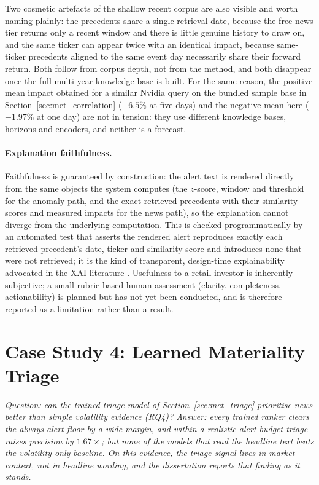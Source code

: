 Two cosmetic artefacts of the shallow recent corpus are also visible and worth
naming plainly: the precedents share a single retrieval date, because the free news tier returns only a
recent window and there is little genuine history to draw on, and the same ticker can appear twice with an
identical impact, because same-ticker precedents aligned to the same event day necessarily share their
forward return. Both follow from corpus depth, not from the method, and both disappear once the full
multi-year knowledge base is built. For the same reason, the positive mean impact obtained for a similar
Nvidia query on the bundled sample base in Section~\ref{sec:met_correlation} ($+6.5\%$ at five days) and
the negative mean here ($-1.97\%$ at one day) are not in tension: they use different knowledge bases,
horizons and encoders, and neither is a forecast.

\paragraph{Explanation faithfulness.}
Faithfulness is guaranteed by construction: the alert text is rendered directly from the same objects
the system computes (the $z$-score, window and threshold for the anomaly path, and the exact retrieved
precedents with their similarity scores and measured impacts for the news path), so the explanation
cannot diverge from the underlying computation. This is checked programmatically by an automated test
that asserts the rendered alert reproduces exactly each retrieved precedent's date, ticker and
similarity score and introduces none that were not retrieved; it is the kind of transparent, design-time
explainability advocated in the XAI literature \autocite{arrieta2020xai}. Usefulness to a retail
investor is inherently subjective; a small rubric-based human assessment (clarity, completeness,
actionability) is planned but has not yet been conducted, and is therefore reported as a limitation
rather than a result.

\section{Case Study 4: Learned Materiality Triage}
\label{sec:cs_triage}

\emph{Question: can the trained triage model of Section~\ref{sec:met_triage} prioritise news better
than simple volatility evidence (\gls{RQ}4)? Answer: every trained ranker clears the always-alert
floor by a wide margin, and within a realistic alert budget triage raises precision by $1.67\times$; but
none of the models that read the headline text beats the volatility-only baseline. On this evidence,
the triage signal lives in market context, not in headline wording, and the dissertation reports that
finding as it stands.}

